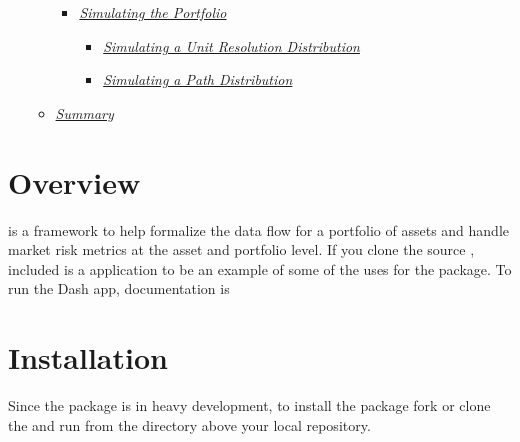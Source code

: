 \documentclass[letterpaper,10pt,english]{sphinxmanual}
\begin{document}
\begin{itemize}
\begin{itemize}
\begin{itemize}
\item {} 
\sphinxAtStartPar
{\hyperref[\detokenize{gettingstarted:simulating-the-portfolio}]{\emph{Simulating the Portfolio}}}
\begin{itemize}
\item {} 
\sphinxAtStartPar
{\hyperref[\detokenize{gettingstarted:simulating-a-unit-resolution-distribution}]{\emph{Simulating a Unit Resolution
Distribution}}}

\item {} 
\sphinxAtStartPar
{\hyperref[\detokenize{gettingstarted:simulating-a-path-distribution}]{\emph{Simulating a Path
Distribution}}}

\end{itemize}

\end{itemize}

\item {} 
\sphinxAtStartPar
{\hyperref[\detokenize{gettingstarted:summary}]{\emph{Summary}}}

\end{itemize}

\end{itemize}


\section{Overview}
\label{\detokenize{gettingstarted:overview}}
\sphinxAtStartPar
{} is a framework to
help formalize the data flow for a portfolio of assets and handle market
risk metrics at the asset and portfolio level. If you clone the source
, included is a
 application to be an example of some of
the uses for the package. To run the Dash app, documentation is


\section{Installation}
\label{\detokenize{gettingstarted:installation}}
\sphinxAtStartPar
Since the package is in heavy development, to install the package fork
or clone the  and
run  from the directory above your local
repository.
\end{document}
